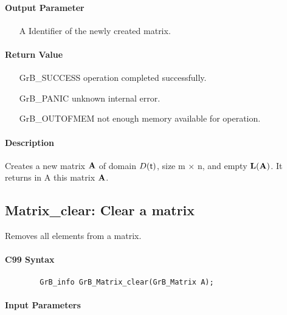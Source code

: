 \paragraph{Output Parameter}

\begin{itemize}[leftmargin=1.1in]
    \item[{\sf A}] Identifier of the newly created matrix.
\end{itemize}

\paragraph{Return Value}

\begin{itemize}[leftmargin=2.1in]
\item[{\sf GrB\_SUCCESS}]   operation completed successfully.
\item[{\sf GrB\_PANIC}]     unknown internal error.
\item[{\sf GrB\_OUTOFMEM}]  not enough memory available for operation.
\end{itemize}

\paragraph{Description}

Creates a new matrix ${\bf A}$ of domain $D({\sf t})$, size {\sf m $\times$ n}, and
empty $\bold{L}({\bf A})$. It returns in {\sf A} this matrix ${\bf A}$.

\subsection{{\sf Matrix\_clear}: Clear a matrix}

Removes all elements from a matrix.

\paragraph{C99 Syntax}

\begin{verbatim}
        GrB_info GrB_Matrix_clear(GrB_Matrix A);
\end{verbatim}

\paragraph{Input Parameters}

